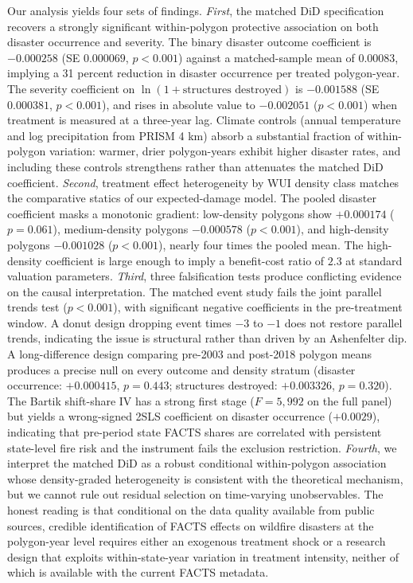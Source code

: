 \documentclass[12pt, letterpaper]{article}
\begin{document}
Our analysis yields four sets of findings. \textit{First}, the matched DiD specification recovers a strongly significant within-polygon protective association on both disaster occurrence and severity. The binary disaster outcome coefficient is $-0.000258$ (SE $0.000069$, $p < 0.001$) against a matched-sample mean of $0.00083$, implying a 31 percent reduction in disaster occurrence per treated polygon-year. The severity coefficient on $\ln(1 + \text{structures destroyed})$ is $-0.001588$ (SE $0.000381$, $p < 0.001$), and rises in absolute value to $-0.002051$ ($p < 0.001$) when treatment is measured at a three-year lag. Climate controls (annual temperature and log precipitation from PRISM 4 km) absorb a substantial fraction of within-polygon variation: warmer, drier polygon-years exhibit higher disaster rates, and including these controls strengthens rather than attenuates the matched DiD coefficient. \textit{Second}, treatment effect heterogeneity by WUI density class matches the comparative statics of our expected-damage model. The pooled disaster coefficient masks a monotonic gradient: low-density polygons show $+0.000174$ ($p = 0.061$), medium-density polygons $-0.000578$ ($p < 0.001$), and high-density polygons $-0.001028$ ($p < 0.001$), nearly four times the pooled mean. The high-density coefficient is large enough to imply a benefit-cost ratio of $2.3$ at standard valuation parameters. \textit{Third}, three falsification tests produce conflicting evidence on the causal interpretation. The matched event study fails the joint parallel trends test ($p < 0.001$), with significant negative coefficients in the pre-treatment window. A donut design dropping event times $-3$ to $-1$ does not restore parallel trends, indicating the issue is structural rather than driven by an Ashenfelter dip. A long-difference design comparing pre-2003 and post-2018 polygon means produces a precise null on every outcome and density stratum (disaster occurrence: $+0.000415$, $p = 0.443$; structures destroyed: $+0.003326$, $p = 0.320$). The Bartik shift-share IV has a strong first stage ($F = 5{,}992$ on the full panel) but yields a wrong-signed 2SLS coefficient on disaster occurrence ($+0.0029$), indicating that pre-period state FACTS shares are correlated with persistent state-level fire risk and the instrument fails the exclusion restriction. \textit{Fourth}, we interpret the matched DiD as a robust conditional within-polygon association whose density-graded heterogeneity is consistent with the theoretical mechanism, but we cannot rule out residual selection on time-varying unobservables. The honest reading is that conditional on the data quality available from public sources, credible identification of FACTS effects on wildfire disasters at the polygon-year level requires either an exogenous treatment shock or a research design that exploits within-state-year variation in treatment intensity, neither of which is available with the current FACTS metadata.
\end{document}
